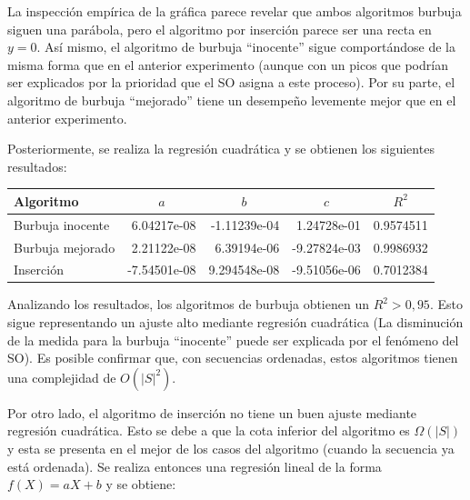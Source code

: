 \documentclass[letter]{article}
\begin{document}
La inspección empírica de la gráfica parece revelar que ambos algoritmos burbuja siguen una parábola, pero el algoritmo por inserción parece ser una recta en $y=0$. Así mismo, el algoritmo de burbuja ``inocente'' sigue comportándose de la misma forma que en el anterior experimento (aunque con un picos que podrían ser explicados por la prioridad que el SO asigna a este proceso). Por su parte, el algoritmo de burbuja ``mejorado'' tiene un desempeño levemente mejor que en el anterior experimento. \par

Posteriormente, se realiza la regresión cuadrática y se obtienen los siguientes resultados: \par

\begin{table}[!ht]
\begin{tabular}{|l|r|r|r|r|}
\hline
Algoritmo        & \multicolumn{1}{c|}{$a$} & \multicolumn{1}{c|}{$b$} & \multicolumn{1}{c|}{$c$} & \multicolumn{1}{c|}{$R^2$} \\ \hline
Burbuja inocente & 6.04217e-08            & -1.11239e-04            & 1.24728e-01            & 0.9574511              \\ \hline
Burbuja mejorado & 2.21122e-08            & 6.39194e-06            & -9.27824e-03            & 0.9986932              \\ \hline
Inserción        & -7.54501e-08            & 9.294548e-08            & -9.51056e-06           & 0.7012384              \\ \hline
\end{tabular}
\end{table}

Analizando los resultados, los algoritmos de burbuja obtienen un $R^2 > 0,95$. Esto sigue representando un ajuste alto mediante regresión cuadrática (La disminución de la medida para la burbuja ``inocente'' puede ser explicada por el fenómeno del SO). Es posible confirmar que, con secuencias ordenadas, estos algoritmos tienen una complejidad de $O(|S|^2)$. \par

Por otro lado, el algoritmo de inserción no tiene un buen ajuste mediante regresión cuadrática. Esto se debe a que la cota inferior del algoritmo es $\Omega(|S|)$ y esta se presenta en el mejor de los casos del algoritmo (cuando la secuencia ya está ordenada). Se realiza entonces una regresión lineal de la forma $f(X) = aX + b$ y se obtiene: \par
\end{document}
